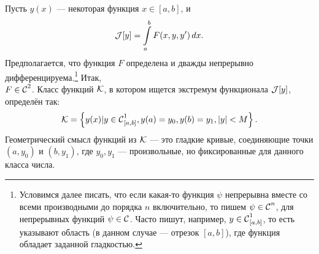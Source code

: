 Пусть $y(x)$ --- некоторая функция $x\in{[a,b]}$, и
\begin{equation*}
	\hfill\J[y]=\int\limits_a^b F(x,y,y')\,dx.\hfill
\end{equation*}
Предполагается, что функция $F$ определена и дважды непрерывно дифференцируема.\footnote{Условимся далее писать, что если какая-то функция $\psi$ непрерывна вместе со всеми производными до порядка $n$ включительно, то пишем $\psi\in\Cfn[]{n}$, для непрерывных функций $\psi\in\Cfn[]{}$. Часто пишут, например, $y\in\Cfn[{[a,b]}]{1}$, то есть указывают область (в данном случае --- отрезок ${[a,b]}$), где функция обладает заданной гладкостью.} Итак,\\ $F\in\Cfn[]{2}$. Класс функций $\mc{K}$, в котором ищется экстремум функционала $\J[y]$, определён так:
\begin{equation*}
	\hfill\mc{K}=\left\{y(x)|y\in\Cfn[{[a,b]}]{1}, y(a)=y_0, y(b)=y_1, |y|<M\right\}.\hfill
\end{equation*} 
Геометрический смысл функций из $\mc{K}$ --- это гладкие кривые, соединяющие точки $(a,y_0)$ и $(b, y_1)$, где $y_0, y_1$ --- произвольные, но фиксированные для данного класса числа.


